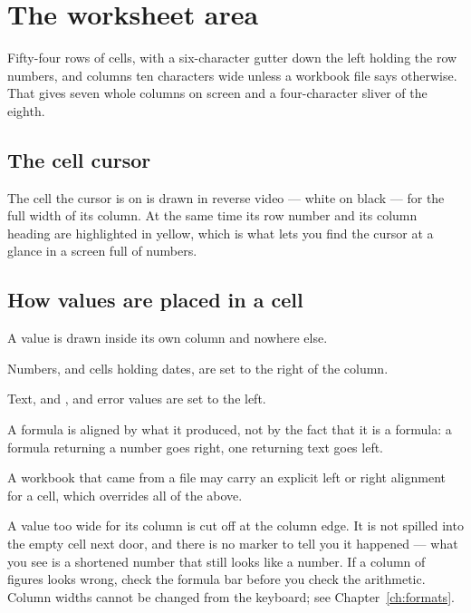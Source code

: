 \section{The worksheet area}

Fifty-four rows of cells, with a six-character gutter down the left holding the
row numbers, and columns ten characters wide unless a workbook file says
otherwise. That gives seven whole columns on screen and a four-character sliver
of the eighth.

\subsection{The cell cursor}

The cell the cursor is on is drawn in reverse video --- white on black --- for
the full width of its column. At the same time its row number and its column
heading are highlighted in yellow, which is what lets you find the cursor at a
glance in a screen full of numbers.

\subsection{How values are placed in a cell}

A value is drawn inside its own column and nowhere else.

\begin{ccsteps}
\item Numbers, and cells holding dates, are set to the right of the column.
\item Text,  and , and error values are set to the left.
\item A formula is aligned by what it produced, not by the fact that it is a
formula: a formula returning a number goes right, one returning text goes left.
\item A workbook that came from a file may carry an explicit left or right
alignment for a cell, which overrides all of the above.
\end{ccsteps}

\begin{cccaution}
A value too wide for its column is cut off at the column edge. It is not
spilled into the empty cell next door, and there is no \lit{\#\#\#\#} marker to
tell you it happened --- what you see is a shortened number that still looks
like a number. If a column of figures looks wrong, check the formula bar before
you check the arithmetic. Column widths cannot be changed from the keyboard;
see Chapter~\ref{ch:formats}.
\end{cccaution}

